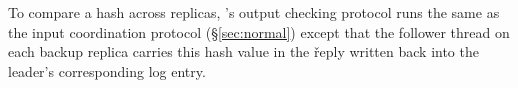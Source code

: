 

To compare a hash across replicas, \xxx's output checking protocol runs the 
same as the input coordination protocol (\S\ref{sec:normal}) except that the 
follower thread on each backup replica carries this hash value in the \v{reply} 
written back into the leader's corresponding log entry.



% 

